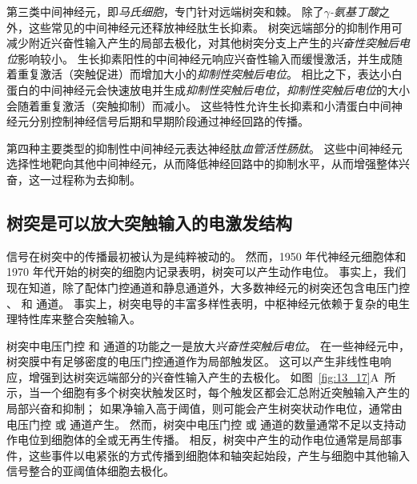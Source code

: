 第三类中间神经元，即\textit{马氏细胞}，专门针对远端树突和棘。
除了\textit{$\gamma$-氨基丁酸}之外，这些常见的中间神经元还释放神经肽生长抑素。
树突远端部分的抑制作用可减少附近兴奋性输入产生的局部去极化，对其他树突分支上产生的\textit{兴奋性突触后电位}影响较小。
生长抑素阳性的中间神经元响应兴奋性输入而缓慢激活，并生成随着重复激活（突触促进）而增加大小的\textit{抑制性突触后电位}。 
相比之下，表达小白蛋白的中间神经元会快速放电并生成\textit{抑制性突触后电位}，\textit{抑制性突触后电位}的大小会随着重复激活（突触抑制）而减小。
这些特性允许生长抑素和小清蛋白中间神经元分别控制神经信号后期和早期阶段通过神经回路的传播。


第四种主要类型的抑制性中间神经元表达神经肽\textit{血管活性肠肽}。
这些中间神经元选择性地靶向其他中间神经元，从而降低神经回路中的抑制水平，从而增强整体兴奋，这一过程称为去抑制。



\subsection{树突是可以放大突触输入的电激发结构}

信号在树突中的传播最初被认为是纯粹被动的。
然而，1950 年代神经元细胞体和 1970 年代开始的树突的细胞内记录表明，树突可以产生动作电位。
事实上，我们现在知道，除了配体门控通道和静息通道外，大多数神经元的树突还包含电压门控 、 和  通道。
事实上，树突电导的丰富多样性表明，中枢神经元依赖于复杂的电生理特性库来整合突触输入。


树突中电压门控  和  通道的功能之一是放大\textit{兴奋性突触后电位}。
在一些神经元中，树突膜中有足够密度的电压门控通道作为局部触发区。
这可以产生非线性电响应，增强到达树突远端部分的兴奋性输入产生的去极化。
如图~\ref{fig:13_17}A~所示，当一个细胞有多个树突状触发区时，每个触发区都会汇总附近突触输入产生的局部兴奋和抑制；
如果净输入高于阈值，则可能会产生树突状动作电位，通常由电压门控  或  通道产生。
然而，树突中电压门控  或  通道的数量通常不足以支持动作电位到细胞体的全或无再生传播。
相反，树突中产生的动作电位通常是局部事件，这些事件以电紧张的方式传播到细胞体和轴突起始段，产生与细胞中其他输入信号整合的亚阈值体细胞去极化。


